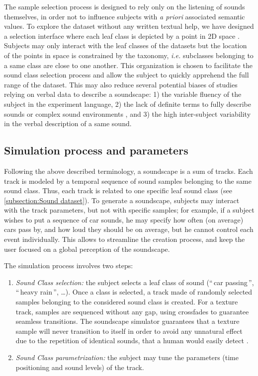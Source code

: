 \documentclass[twoside,twocolumn]{article}
\begin{document}
The sample selection process is designed to rely only on the listening of sounds themselves, in order not to influence subjects with \textit{a priori} associated semantic values. To explore the dataset without any written textual help, we have designed a selection interface where each leaf class is depicted by a point in 2D space \cite{lafay:hal-01300399}. Subjects may only interact with the leaf classes of the datasets but the location of the points in space is constrained by the taxonomy, \textit{i.e.} subclasses belonging to a same class are close to one another. This organization is chosen to facilitate the sound class selection process and allow the subject to quickly apprehend the full range of the dataset. This may also reduce several potential biases of studies relying on verbal data to describe a soundscape: 1) the variable fluency of the subject in the experiment language, 2) the lack of definite terms to fully describe sounds or complex sound environments \cite{guastavino_ideal_2006}, and 3) the high inter-subject variability in the verbal description of a same sound.


\subsection{Simulation process and parameters}
\label{sec:simulationProcess}

Following the above described terminology, a soundscape is a sum of tracks. Each track is modeled by a temporal sequence of sound samples belonging to the same sound class. Thus, each track is related to one specific leaf sound class (see \ref{subsection:Sound dataset}). To generate a soundscape, subjects may interact with the track parameters, but not with specific samples; for example, if a subject wishes to put a sequence of car sounds, he may specify how often (on average) cars pass by, and how loud they should be on average, but he cannot control each event individually. This allows to streamline the creation process, and keep the user focused on a global perception of the soundscape.

The simulation process involves two steps: 

\begin{enumerate}
\item \textit{Sound Class selection:}  the subject selects a leaf class of sound (``\,car passing\,'', ``\,heavy rain\,'', \ldots{}). Once a class is selected, a track made of randomly selected samples belonging to the considered sound class is created. For a texture track, samples are sequenced without any gap, using crossfades to guarantee seamless transitions. The soundscape simulator guarantees that a texture sample will never transition to itself in order to avoid any unnatural effect due to the repetition of identical sounds, that a human would easily detect \cite{agus_rapid_2010}.
\item \textit{Sound Class parametrization:} the subject may tune the parameters (time positioning and sound levels) of the track.
\end{enumerate}
\end{document}
